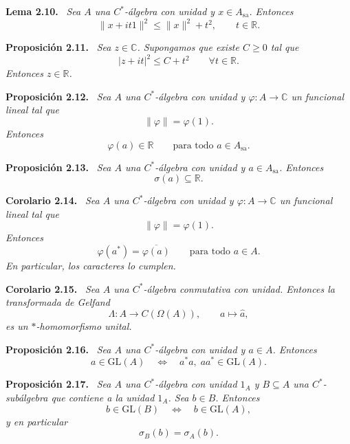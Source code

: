 \documentclass[11pt]{article}
\newcommand{\Asa}{A_{\mathrm{sa}}}
\newcommand{\GL}{\mathrm{GL}}
\newenvironment{proposicion}[1]
  {\par\medskip\noindent\textbf{Proposición #1.}\ \itshape}
  {\par\medskip}
\newenvironment{corolario}[1]
  {\par\medskip\noindent\textbf{Corolario #1.}\ \itshape}
  {\par\medskip}
\newenvironment{lema}[1]
  {\par\medskip\noindent\textbf{Lema #1.}\ \itshape}
  {\par\medskip}
\begin{document}
\begin{lema}{2.10}
Sea $A$ una $C^*$-álgebra con unidad y $x\in\Asa$. Entonces
\[
  \lVert x+it1\rVert^2\leq \lVert x\rVert^2+t^2,
  \qquad t\in\mathbb{R}.
\]
\end{lema}

\begin{proposicion}{2.11}
Sea $z\in\mathbb{C}$. Supongamos que existe $C\geq0$ tal que
\[
  |z+it|^2\leq C+t^2
  \qquad \forall t\in\mathbb{R}.
\]
Entonces $z\in\mathbb{R}$.
\end{proposicion}

\begin{proposicion}{2.12}
Sea $A$ una $C^*$-álgebra con unidad y $\varphi:A\to\mathbb{C}$ un funcional lineal tal que
\[
  \lVert\varphi\rVert=\varphi(1).
\]
Entonces
\[
  \varphi(a)\in\mathbb{R}
  \qquad\text{para todo } a\in\Asa.
\]
\end{proposicion}

\begin{proposicion}{2.13}
Sea $A$ una $C^*$-álgebra con unidad y $a\in\Asa$. Entonces
\[
  \sigma(a)\subseteq\mathbb{R}.
\]
\end{proposicion}

\begin{corolario}{2.14}
Sea $A$ una $C^*$-álgebra con unidad y $\varphi:A\to\mathbb{C}$ un funcional lineal tal que
\[
  \lVert\varphi\rVert=\varphi(1).
\]
Entonces
\[
  \varphi(a^*)=\overline{\varphi(a)}
  \qquad\text{para todo }a\in A.
\]
En particular, los caracteres lo cumplen.
\end{corolario}

\begin{corolario}{2.15}
Sea $A$ una $C^*$-álgebra conmutativa con unidad. Entonces la transformada de Gelfand
\[
  \Lambda:A\longrightarrow C(\Omega(A)),
  \qquad
  a\longmapsto \widehat a,
\]
es un $*$-homomorfismo unital.
\end{corolario}

\begin{proposicion}{2.16}
Sea $A$ una $C^*$-álgebra con unidad y $a\in A$. Entonces
\[
  a\in\GL(A)
  \quad\Longleftrightarrow\quad
  a^*a,\;aa^*\in\GL(A).
\]
\end{proposicion}

\begin{proposicion}{2.17}
Sea $A$ una $C^*$-álgebra con unidad $1_A$ y $B\subseteq A$ una $C^*$-subálgebra que contiene a la unidad $1_A$. Sea $b\in B$. Entonces
\[
  b\in\GL(B)
  \quad\Longleftrightarrow\quad
  b\in\GL(A),
\]
y en particular
\[
  \sigma_B(b)=\sigma_A(b).
\]
\end{proposicion}
\end{document}
